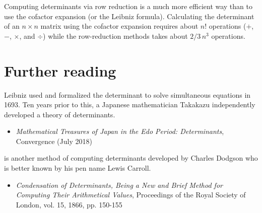 \documentclass{ximera}
\begin{document}
\begin{remark}
  Computing determinants via row reduction is a much more efficient
  way than to use the cofactor expansion (or the Leibniz
  formula). Calculating the determinant of an $n \times n$ matrix using the
  cofactor expansion requires about $n!$ operations ($+$, $-$, $\times$, and $\div$) while the
  row-reduction methods takes about $2/3\, n^3$ operations.

\end{remark}





\section{Further reading}

Leibniz used and formalized the determinant to solve simultaneous
equations in 1693. Ten years prior to this, a Japanese mathematician
Takakazu independently developed a theory of determinants.
\begin{itemize}
\item
  \textit{Mathematical Treasures of Japan in the Edo
    Period: Determinants}, Convergence (July 2018)
\end{itemize}

 is another method of computing determinants
developed by Charles Dodgson who is better known by his pen name Lewis
Carroll.
\begin{itemize}
\item
  \textit{Condensation of Determinants, Being a New and Brief Method
    for Computing Their Arithmetical Values}, Proceedings of the Royal
  Society of London, vol. 15, 1866, pp. 150-155
\end{itemize}
\end{document}
